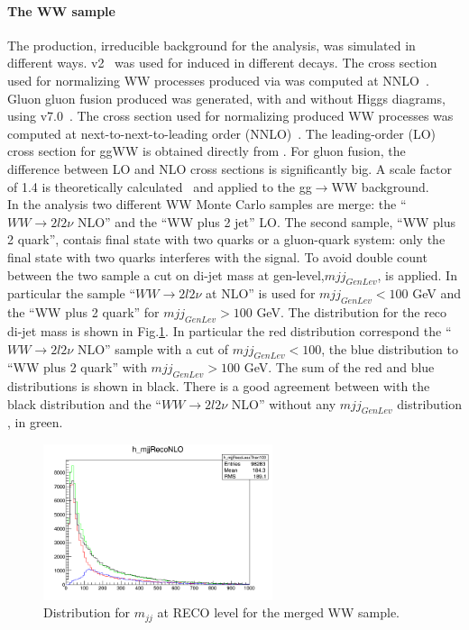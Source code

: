 \paragraph{The WW sample} The \WW production, irreducible background for the analysis, was simulated in different ways. 
\POWHEG v2~\cite{Melia:2011tj} was used for \qqbar induced \WW in different decays. 
The cross section used for normalizing WW processes produced via \qqbar was computed at NNLO~\cite{Gehrmann:2014fva}. 
Gluon gluon fusion produced \WW was generated, with and without Higgs diagrams, using \MCFM v7.0~\cite{Campbell:2013wga}. 
The cross section used for normalizing \qqbar produced WW processes was computed at next-to-next-to-leading order
(NNLO)~\cite{Gehrmann:2014fva}. The leading-order (LO) cross section for ggWW is obtained directly from \MCFM.
For gluon fusion, the difference between LO and NLO cross sections is significantly big.
A scale factor of 1.4 is theoretically calculated~\cite{Caola:2015rqy} and applied to the gg$\to$WW background. \\
In the analysis two different WW Monte Carlo samples are merge: the ``$WW \rightarrow 2l 2\nu$ NLO'' and the ``WW plus 2 jet'' LO.  
The second sample,  ``WW plus 2 quark'', contais final state with two quarks or a gluon-quark system: only the final state with two quarks interferes with the signal.
To avoid double count between the two sample a cut on di-jet mass at gen-level,$mjj_{GenLev}$, is applied. In particular the sample ``$WW \rightarrow 2l 2\nu$ at NLO'' is used for $mjj_{GenLev} <100$ GeV and the ``WW plus 2 quark'' for $mjj_{GenLev} >100$ GeV.
The  distribution for the reco di-jet mass is shown in Fig.\ref{fig:WW}. In particular the red distribution correspond the ``$WW \rightarrow 2l 2\nu$ NLO'' sample with a cut of  $mjj_{GenLev} <100$, the blue distribution to  ``WW plus 2 quark'' with $mjj_{GenLev} >100$ GeV. The sum of the red and blue distributions is shown in black. There is a good agreement between with the black distribution and the ``$WW \rightarrow 2l 2\nu$ NLO'' without any  $mjj_{GenLev}$ distribution , in green.
\begin{figure}[htbp]
\centering
\includegraphics[width=0.6\textwidth]{../AN/Figs/WW_distribution}
\caption{ Distribution for $m_{jj}$ at RECO level for the merged WW sample.}
    \label{fig:WW}
\end{figure}




